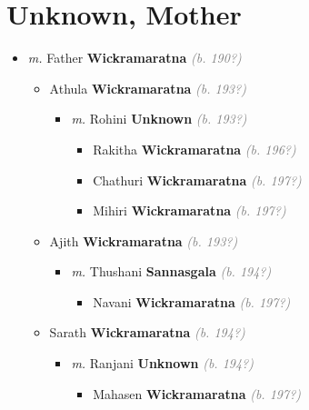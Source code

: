 \documentclass[10pt, openany]{book}
\begin{document}
\chapter{Unknown, Mother}
\label{00000895}
\textcolor{slmaroon}{\textit{}}
\begin{itemize}
\item{\textit{m.} Father \textbf{Wickramaratna} \textcolor{gray}{\textit{(b. 190?)}}   \label{couple:00000895:00000969} \begin{itemize}
\item{Athula \textbf{Wickramaratna} \textcolor{gray}{\textit{(b. 193?)}}
\begin{itemize}
\item{\textit{m.} Rohini \textbf{Unknown} \textcolor{gray}{\textit{(b. 193?)}}   \label{couple:00000904:00000966} \begin{itemize}
\item{Rakitha \textbf{Wickramaratna} \textcolor{gray}{\textit{(b. 196?)}}
 }
\item{Chathuri \textbf{Wickramaratna} \textcolor{gray}{\textit{(b. 197?)}}
 }
\item{Mihiri \textbf{Wickramaratna} \textcolor{gray}{\textit{(b. 197?)}}
 }
\end{itemize}}
\end{itemize}
 }
\item{Ajith \textbf{Wickramaratna} \textcolor{gray}{\textit{(b. 193?)}}
\begin{itemize}
\item{\textit{m.} Thushani \textbf{Sannasgala} \textcolor{gray}{\textit{(b. 194?)}}   \label{couple:00000698:00000964} \begin{itemize}
\item{Navani \textbf{Wickramaratna} \textcolor{gray}{\textit{(b. 197?)}}
 }
\end{itemize}}
\end{itemize}
 }
\item{Sarath \textbf{Wickramaratna} \textcolor{gray}{\textit{(b. 194?)}}
\begin{itemize}
\item{\textit{m.} Ranjani \textbf{Unknown} \textcolor{gray}{\textit{(b. 194?)}}   \label{couple:00000900:00000976} \begin{itemize}
\item{Mahasen \textbf{Wickramaratna} \textcolor{gray}{\textit{(b. 197?)}}
}
\end{itemize}}
\end{itemize}}
\end{itemize}}
\end{itemize}
\end{document}

